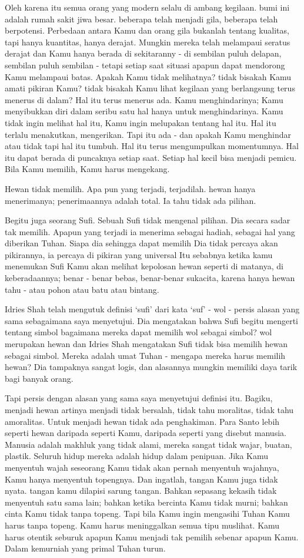 Oleh karena itu semua orang yang modern selalu di ambang kegilaan. bumi ini adalah rumah sakit jiwa besar. beberapa telah menjadi gila, beberapa telah berpotensi. Perbedaan antara Kamu dan orang gila bukanlah tentang kualitas, tapi hanya kuantitas, hanya derajat. 
Mungkin mereka telah melampaui seratus derajat dan Kamu hanya berada di sekitaranny - di sembilan puluh delapan, sembilan puluh sembilan - tetapi setiap saat situasi apapun dapat mendorong Kamu melampaui batas. Apakah Kamu tidak melihatnya? tidak bisakah Kamu amati pikiran Kamu? tidak bisakah Kamu lihat kegilaan yang berlangsung terus menerus di dalam? Hal itu terus menerus ada. Kamu menghindarinya; Kamu menyibukkan diri dalam seribu satu hal hanya untuk menghindarinya. Kamu tidak ingin melihat hal itu, Kamu ingin melupakan tentang hal itu. Hal itu terlalu menakutkan, mengerikan. Tapi itu ada - dan apakah Kamu menghindar atau tidak tapi hal itu tumbuh.
Hal itu terus mengumpulkan momentumnya. Hal itu dapat berada di puncaknya setiap saat. Setiap hal kecil bisa menjadi pemicu. Bila Kamu memilih, Kamu harus mengekang.

Hewan tidak memilih. Apa pun yang terjadi, terjadilah. hewan hanya menerimanya; penerimaannya adalah
total. Ia tahu tidak ada pilihan.

Begitu juga seorang Sufi. Sebuah Sufi tidak mengenal pilihan. Dia secara sadar tak memilih. Apapun yang terjadi ia menerima sebagai hadiah, sebagai hal yang diberikan Tuhan. Siapa dia sehingga dapat memilih Dia tidak percaya akan pikirannya, ia percaya di pikiran yang universal Itu sebabnya ketika kamu menemukan Sufi Kamu akan melihat kepolosan hewan seperti di matanya, di keberadaannya; benar - benar bebas, benar-benar sukacita, karena hanya hewan tahu - atau pohon atau batu atau bintang.

Idries Shah telah mengutuk definisi ‘sufi’ dari kata ‘suf’ - wol - persis alasan yang sama sebagaimana saya menyetujui. Dia mengatakan bahwa Sufi begitu mengerti tentang simbol bagaimana mereka dapat memilih wol
sebagai simbol? wol merupakan hewan dan Idries Shah mengatakan Sufi tidak bisa memilih hewan
sebagai simbol. Mereka adalah umat Tuhan - mengapa mereka harus memilih hewan? Dia tampaknya sangat
logis, dan alasannya mungkin memiliki daya tarik bagi banyak orang.

Tapi persis dengan alasan yang sama saya menyetujui definisi itu. Bagiku, menjadi hewan artinya menjadi
tidak bersalah, tidak tahu moralitas, tidak tahu amoralitas. Untuk menjadi hewan tidak ada penghakiman. Para Santo lebih seperti hewan daripada seperti Kamu, daripada seperti yang disebut manusia. Manusia
adalah makhluk yang tidak alami, mereka sangat tidak wajar, buatan, plastik. Seluruh hidup mereka adalah hidup dalam penipuan. Jika Kamu menyentuh wajah seseorang Kamu tidak akan pernah menyentuh wajahnya, Kamu hanya menyentuh topengnya. Dan ingatlah, tangan Kamu juga tidak nyata. tangan kamu dilapisi sarung tangan. Bahkan sepasang kekasih tidak menyentuh satu sama lain; bahkan ketika bercinta Kamu tidak murni; bahkan cinta Kamu tidak tanpa topeng. Tapi bila Kamu ingin mengasihi Tuhan Kamu harus tanpa topeng. Kamu harus meninggalkan semua tipu muslihat. Kamu harus otentik seburuk apapun Kamu
menjadi tak pemilih sebenar apapun Kamu. Dalam kemurniah yang primal Tuhan turun.

